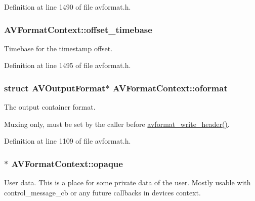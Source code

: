 Definition at line 1490 of file avformat.\+h.

\subsubsection[{\texorpdfstring{offset\+\_\+timebase}{offset_timebase}}]{ A\+V\+Format\+Context\+::offset\+\_\+timebase}\hypertarget{struct_a_v_format_context_ad8f1cdcd2d3193d962c1834835d790c6}{}\label{struct_a_v_format_context_ad8f1cdcd2d3193d962c1834835d790c6}
Timebase for the timestamp offset. 

Definition at line 1495 of file avformat.\+h.

\subsubsection[{\texorpdfstring{oformat}{oformat}}]{\setlength{\rightskip}{0pt plus 5cm}struct {\bf A\+V\+Output\+Format}$\ast$ A\+V\+Format\+Context\+::oformat}\hypertarget{struct_a_v_format_context_a20d80ac07e38ff5c268d15aaf2798b98}{}\label{struct_a_v_format_context_a20d80ac07e38ff5c268d15aaf2798b98}
The output container format.

Muxing only, must be set by the caller before \hyperlink{group__lavf__encoding_ga78d4e734fecb1d2385536e6dd5b7b9f5}{avformat\+\_\+write\+\_\+header()}. 

Definition at line 1109 of file avformat.\+h.

\subsubsection[{\texorpdfstring{opaque}{opaque}}]{$\ast$ A\+V\+Format\+Context\+::opaque}\hypertarget{struct_a_v_format_context_a71797838db59ca0682dd2d18b149134e}{}\label{struct_a_v_format_context_a71797838db59ca0682dd2d18b149134e}
User data. This is a place for some private data of the user. Mostly usable with control\+\_\+message\+\_\+cb or any future callbacks in device\textquotesingle{}s context. 


